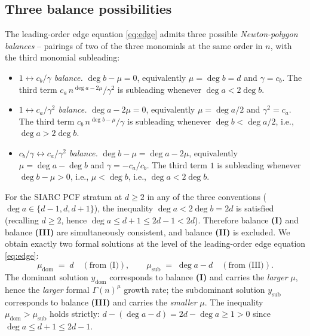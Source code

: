 \documentclass[11pt,reqno]{amsart}
\theoremstyle{plain}
\theoremstyle{definition}
\theoremstyle{remark}
\newcommand{\dega}{\deg a}
\newcommand{\degb}{\deg b}
\begin{document}
\subsection{Three balance possibilities}
\label{sec:wz-three-balances}
The leading-order edge equation \eqref{eq:edge} admits three
possible \emph{Newton-polygon balances} -- pairings of two of
the three monomials at the same order in $n$, with the third
monomial subleading:

\begin{itemize}[leftmargin=2.2em]
\item[\textbf{(I)}] \emph{$1 \leftrightarrow c_b/\gamma$ balance.}
   $\degb - \mu = 0$, equivalently $\mu = \degb = d$ and
   $\gamma = c_b$. The third term
   $c_a\,n^{\dega - 2\mu}/\gamma^{2}$ is subleading whenever
   $\dega < 2\degb$.
\item[\textbf{(II)}] \emph{$1 \leftrightarrow c_a/\gamma^{2}$ balance.}
   $\dega - 2\mu = 0$, equivalently $\mu = \dega / 2$ and
   $\gamma^{2} = c_a$. The third term
   $c_b\,n^{\degb - \mu}/\gamma$ is subleading whenever
   $\degb < \dega / 2$, i.e., $\dega > 2\degb$.
\item[\textbf{(III)}] \emph{$c_b/\gamma \leftrightarrow c_a/\gamma^{2}$
   balance.} $\degb - \mu = \dega - 2\mu$, equivalently
   $\mu = \dega - \degb$ and $\gamma = -c_a / c_b$. The third
   term $1$ is subleading whenever $\degb - \mu > 0$, i.e.,
   $\mu < \degb$, i.e., $\dega < 2\degb$.
\end{itemize}

For the SIARC PCF stratum at $d \ge 2$ in any of the three
conventions ($\dega \in \{d-1, d, d+1\}$), the inequality
$\dega < 2\degb = 2d$ is satisfied (recalling $d \ge 2$, hence
$\dega \le d+1 \le 2d - 1 < 2d$). Therefore balance \textbf{(I)}
and balance \textbf{(III)} are simultaneously consistent, and
balance \textbf{(II)} is excluded. We obtain exactly two formal
solutions at the level of the leading-order edge equation
\eqref{eq:edge}:
\begin{equation}
\label{eq:dom-sub}
  \mu_{\mathrm{dom}} \;=\; d
  \quad (\text{from (I)}),
  \qquad
  \mu_{\mathrm{sub}} \;=\; \dega - d
  \quad (\text{from (III)}).
\end{equation}
The dominant solution $y_{\mathrm{dom}}$ corresponds to balance
\textbf{(I)} and carries the \emph{larger} $\mu$, hence the
\emph{larger} formal $\Gamma(n)^{\mu}$ growth rate; the
subdominant solution $y_{\mathrm{sub}}$ corresponds to balance
\textbf{(III)} and carries the \emph{smaller} $\mu$. The
inequality $\mu_{\mathrm{dom}} > \mu_{\mathrm{sub}}$ holds
strictly: $d - (\dega - d) = 2d - \dega \ge 1 > 0$ since
$\dega \le d + 1 \le 2d - 1$.
\end{document}
